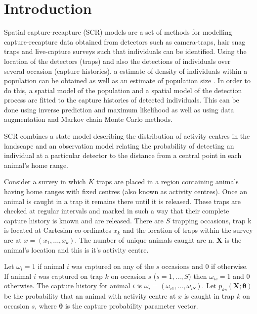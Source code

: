 \documentclass[a4paper,12pt]{article}
\begin{document}
\section{Introduction}
Spatial capture-recapture (SCR) models are a set of methods for modelling capture-recapture data obtained from detectors such as camera-traps, hair snag traps and live-capture surveys such that individuals can be identified. Using the location of the detectors (traps) and also the detections of individuals over several occasion (capture histories), a estimate of density of individuals within a population can be obtained as well as an estimate of population size \citep*{Borchers2012}.
In order to do this, a spatial model of the population and a spatial model of the detection process are fitted to the capture histories of detected individuals.  This can be done using inverse prediction and maximum likelihood as well as using data augmentation and Markov chain Monte Carlo methods.

SCR combines a state model describing the distribution of activity centres in the landscape and an observation model relating the probability of detecting an individual at a particular detector to the distance from a central point in each animal's home range.

Consider a survey in which $K$ traps are placed in a region containing animals having home ranges with fixed centres (also known as activity centres). Once an animal is caught in a trap it remains there until it is released. These traps are checked at regular intervals and marked in such a way that their complete capture history is known and are released.  There are $S$ trapping occasions, trap k is located at Cartesian co-ordinates $x_k$ and the location of traps within the survey are at $x=(x_1, ..., x_k)$. The number of unique animals caught are n. $\bm{X}$ is the animal's location and this is it's activity centre.

Let $\omega_{i}=1$ if animal $i$ was captured on any of the $s$ occasions and $0$ if otherwise. If animal $i$ was captured on trap $k$ on occasion $s$ ($s=1, ...,S$) then $\omega_{is}=1$ and $0$ otherwise. The capture history for animal $i$ is $\omega_{i}=(\omega_{i1}, ..., \omega_{iS})$. Let $p_{ks}(\bm{X};\bm{\theta})$ be the probability that an animal with activity centre at $x$ is caught in trap $k$ on occasion $s$, where $\bm{\theta}$ is the capture probability parameter vector. %
\end{document}
